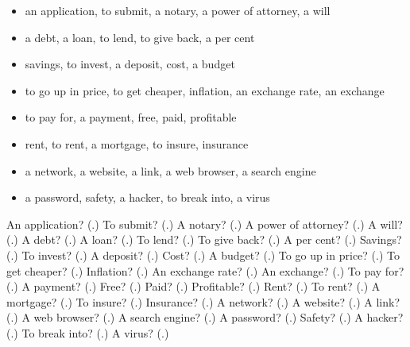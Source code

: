 \begin{itemize}
\raggedright
  \item an application, to submit, a notary, a power of attorney, a will
  \item a debt, a loan, to lend, to give back, a per cent
  \item savings, to invest, a deposit, cost, a budget
  \item to go up in price, to get cheaper, inflation, an exchange rate, an exchange
  \item to pay for, a payment, free, paid, profitable
  \item rent, to rent, a mortgage, to insure, insurance
  \item a network, a website, a link, a web browser, a search engine
  \item a password, safety, a hacker, to break into, a virus
\end{itemize}

\begin{tcolorbox}[breakable,colback=teal!4,colframe=teal!35!black,title={Before you move on}]
An application? (\textbf{}.) To submit? (\textbf{}.) A notary? (\textbf{}.) A power of attorney? (\textbf{}.) A will? (\textbf{}.) A debt? (\textbf{}.) A loan? (\textbf{}.) To lend? (\textbf{}.) To give back? (\textbf{}.) A per cent? (\textbf{}.) Savings? (\textbf{}.) To invest? (\textbf{}.) A deposit? (\textbf{}.) Cost? (\textbf{}.) A budget? (\textbf{}.) To go up in price? (\textbf{}.) To get cheaper? (\textbf{}.) Inflation? (\textbf{}.) An exchange rate? (\textbf{}.) An exchange? (\textbf{}.) To pay for? (\textbf{}.) A payment? (\textbf{}.) Free? (\textbf{}.) Paid? (\textbf{}.) Profitable? (\textbf{}.) Rent? (\textbf{}.) To rent? (\textbf{}.) A mortgage? (\textbf{}.) To insure? (\textbf{}.) Insurance? (\textbf{}.) A network? (\textbf{}.) A website? (\textbf{}.) A link? (\textbf{}.) A web browser? (\textbf{}.) A search engine? (\textbf{}.) A password? (\textbf{}.) Safety? (\textbf{}.) A hacker? (\textbf{}.) To break into? (\textbf{}.) A virus? (\textbf{}.)
\end{tcolorbox}
